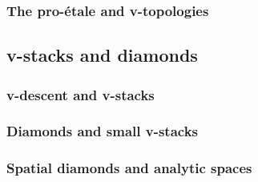         \subsubsection{The pro-\'etale and v-topologies}
    
    \subsection{v-stacks and diamonds}
        \subsubsection{v-descent and v-stacks}
        
        \subsubsection{Diamonds and small v-stacks}
        
        \subsubsection{Spatial diamonds and analytic spaces}